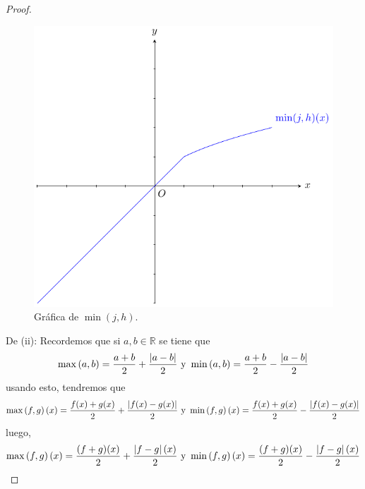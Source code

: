 \documentclass[12pt]{article}
\begin{document}
\begin{enumerate}
\begin{proof}
        \begin{figure}
            \begin{center}
                \includegraphics[scale=1]{images/3_12_6.pdf}
            \end{center}
            \caption{Gráfica de $\min(j,h)$.}
        \end{figure}

        De (ii): Recordemos que si $a,b\in\mathbb{R}$ se tiene que
        \begin{equation*}
            \max\left(a,b \right)=\frac{a+b}{2}+\frac{\left| a-b \right|}{2}\textup{ y }\min\left(a,b \right)=\frac{a+b}{2}-\frac{\left| a-b \right|}{2}
        \end{equation*}
        usando esto, tendremos que
        \begin{equation*}
            \max\left(f,g \right)(x)=\frac{f(x)+g(x)}{2}+\frac{\left| f(x)-g(x) \right|}{2}\textup{ y }\min\left(f,g \right)(x)=\frac{f(x)+g(x)}{2}-\frac{\left| f(x)-g(x) \right|}{2}
        \end{equation*}
        luego,
        \begin{equation*}
            \max\left(f,g \right)(x)=\frac{(f+g)(x)}{2}+\frac{\left| f-g \right|(x)}{2}\textup{ y }\min\left(f,g \right)(x)=\frac{(f+g)(x)}{2}-\frac{\left| f-g \right|(x)}{2}
        \end{equation*}
    \end{proof}


\end{enumerate}
\end{document}
